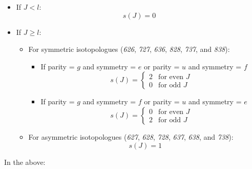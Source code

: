 \begin{itemize}
    \item If \( J < l \):
    \[s(J) = 0\]

    \item If \( J \geq l \):
    \begin{itemize}
        \item For symmetric isotopologues (\textit{626}, \textit{727}, \textit{636}, \textit{828}, \textit{737}, and \textit{838}):
        \begin{itemize}
            \item If parity = \(g\) and symmetry = \(e\) \quad or \quad  parity = \(u\) and symmetry = \(f\)
            \[
            s(J) = \begin{cases}
            2 & \text{for even } J \\
            0 & \text{for odd } J
            \end{cases}
            \]
            \item If parity = \(g\) and symmetry = \(f\) \quad or \quad  parity = \(u\) and symmetry = \(e\)
            \[
            s(J) = \begin{cases}
            0 & \text{for even } J \\
            2 & \text{for odd } J
            \end{cases}
            \]
        \end{itemize}

        \item For asymmetric isotopologues (\textit{627}, \textit{628}, \textit{728}, \textit{637}, \textit{638}, and \textit{738}):
        \[s(J) = 1\]
    \end{itemize}
\end{itemize}

In the above:

